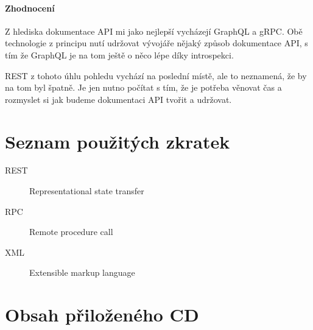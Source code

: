 \documentclass[thesis=M,czech]{FITthesis}[2019/12/23]
\begin{document}
\subsubsection*{Zhodnocení}
Z hlediska dokumentace API mi jako nejlepší vycházejí GraphQL a gRPC. Obě technologie z principu nutí udržovat vývojáře nějaký způsob dokumentace API, s tím že GraphQL je na tom ještě o něco lépe díky introspekci.

REST z tohoto úhlu pohledu vychází na poslední místě, ale to neznamená, že by na tom byl špatně. Je jen nutno počítat s tím, že je potřeba věnovat čas a rozmyslet si jak budeme dokumentaci API tvořit a udržovat. 

\begin{conclusion}
\end{conclusion}




\appendix

\chapter{Seznam použitých zkratek}
\begin{description}
	\item[REST] Representational state transfer
	\item[RPC] Remote procedure call
	\item[XML] Extensible markup language
\end{description} 

\chapter{Obsah přiloženého CD}


\end{document}
